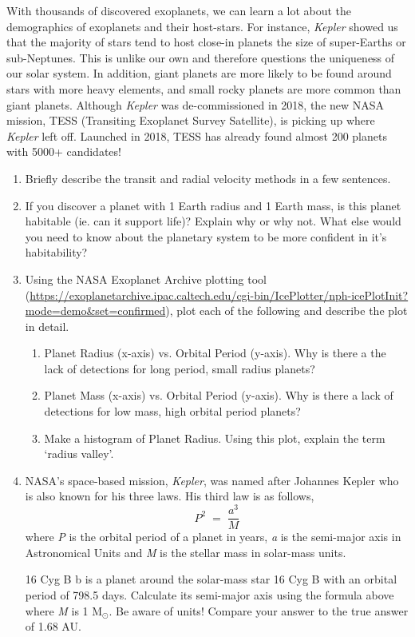 \documentclass[11pt]{article}
\begin{document}
\medskip \noindent
With thousands of discovered exoplanets, we can learn a lot about the demographics of exoplanets and their host-stars. For instance, \textit{Kepler} showed us that the majority of stars tend to host close-in planets the size of super-Earths or sub-Neptunes. This is unlike our own and therefore questions the uniqueness of our solar system. In addition, giant planets are more likely to be found around stars with more heavy elements, and small rocky planets are more common than giant planets.  Although \textit{Kepler} was de-commissioned in 2018, the new NASA mission, TESS (Transiting Exoplanet Survey Satellite), is picking up where \textit{Kepler} left off. Launched in 2018, TESS has already found almost 200 planets with 5000+ candidates! 
\begin{enumerate}
    \item Briefly describe the transit and radial velocity methods in a few sentences.
    \item If you discover a planet with 1 Earth radius and 1 Earth mass, is this planet habitable (ie. can it support life)? Explain why or why not. What else would you need to know about the planetary system to be more confident in it's habitability?
    \item Using the NASA Exoplanet Archive plotting tool (\url{https://exoplanetarchive.ipac.caltech.edu/cgi-bin/IcePlotter/nph-icePlotInit?mode=demo&set=confirmed}), plot each of the following and describe the plot in detail. 
    \begin{enumerate}
        \item Planet Radius (x-axis) vs. Orbital Period (y-axis). Why is there a the lack of detections for long period, small radius planets?
        \item Planet Mass (x-axis) vs. Orbital Period (y-axis). Why is there a lack of detections for low mass, high orbital period planets? 
        \item Make a histogram of Planet Radius. Using this plot, explain the term `radius valley'.
    \end{enumerate}
    \item NASA's space-based mission, \textit{Kepler}, was named after Johannes Kepler who is also known for his three laws. His third law is as follows, \begin{equation}
        P^2 \; = \; \frac{a^3}{M}
    \end{equation}
    where \textit{P} is the orbital period of a planet in years, \textit{a} is the semi-major axis in Astronomical Units and \textit{M} is the stellar mass in solar-mass units.
    
    16 Cyg B b is a planet around the solar-mass star 16 Cyg B with an orbital period of 798.5 days. Calculate its semi-major axis using the formula above where \textit{M} is 1 M$_\odot$. Be aware of units! Compare your answer to the true answer of 1.68 AU.
\end{enumerate}
\end{document}
